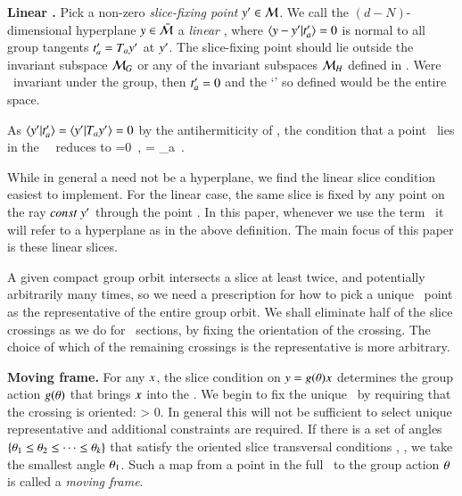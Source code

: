\begin{definition}
\label{def:slice}
\textbf{Linear \slice.}
Pick a non-zero \emph{slice-fixing point} ${y'} \in {\cal M}$.
We call the $(d\!-\!N)$-dimensional hyperplane $y \in \bar{\cal M}$
a \emph{linear \slice}, where
\(
\braket{\sspRed - \slicep}{\sliceTan{a}}=0
\) %
is normal to all group tangents $ t'_{a}= T_a {y'}$ at ${y'}$. The {slice-fixing point} should lie outside the invariant subspace ${\cal M}_{G}$ or any of the invariant subspaces ${\cal M}_H$ defined in . Were \slicep\ invariant under the group, then $t'_{a}=0$ and the `\slice' so defined would be the entire space.

As $ \braket{\slicep}{\sliceTan{a}}=\braket{\slicep}{\Lg_a \slicep} =0 $ by the antihermiticity of \Lg, the condition that a point \sspRed\ lies in the \slice\ \pSRed\ reduces to
\beq
{}=0
    \,,\qquad
{} = \Lg_a \slicep
\,.
\end{definition}

While in general a {\slice} need not be a hyperplane,
we find the linear slice condition  easiest to implement.
For the linear case, the same slice is fixed by any
point on the ray $const\; {y'}$ through the point \slicep.
In this paper, whenever we use the term \slice\ it will refer to a hyperplane as in the above definition. The main focus of this paper is these linear slices.

A given compact group orbit intersects a slice at
least twice, and potentially arbitrarily many times, so we need a prescription for
how to pick a unique \reducedsp\ point as the representative of the entire group orbit.
We shall eliminate half of the slice crossings as we do for
\Poincare\ sections, by fixing the orientation of the crossing.
The choice of which of the remaining crossings is the representative
is more arbitrary.

\begin{definition}
\label{def:movingFrame}
\textbf{Moving frame.}
For any $x$, the slice condition  on $y =
g({\bf \theta})x$ determines the group
action $g({\bf \theta})$ that brings $ x$ into the \slice.
We begin to fix the unique \reducedsp\ by requiring that the crossing is
oriented:
\beq
\braket{\groupTan_{}(\ssp)}{\sliceTan{}} > 0.
In general this will not be sufficient to select unique representative and additional constraints are required.
If there is a set of angles
$\{{\bf \theta}_1\leq{\bf \theta}_2\leq\cdots\leq{\bf \theta}_k \}$ that
satisfy the oriented slice transversal conditions
, , we take the
smallest angle ${\bf \theta}_1$.
Such a map from a point in the full \statesp\ to the group action
${\bf \theta}$ is called a
\emph{moving frame}.
\end{definition}



